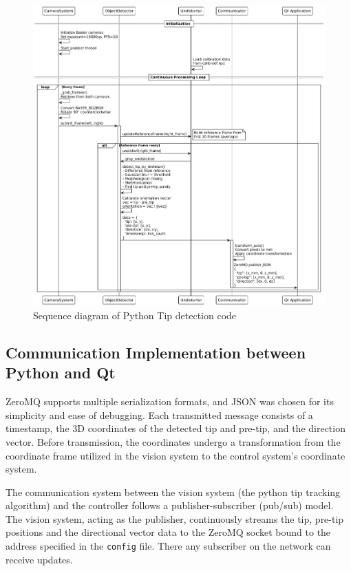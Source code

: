 \begin{figure}
    \centering
    \includegraphics[width=1.1\linewidth]{images/vision/pythonSequencediag.png}
    \caption{Sequence diagram of Python Tip detection code}
    \label{fig:seqpython}
\end{figure}


\subsection{Communication Implementation between Python and Qt}


ZeroMQ supports multiple serialization formats, and JSON was chosen for its simplicity and ease of debugging. Each transmitted message consists of a timestamp, the 3D coordinates of the detected tip and pre-tip, and the direction vector. Before transmission, the coordinates undergo a transformation from the coordinate frame utilized in the vision system to the control system's coordinate system. 

The communication system between the vision system (the python tip tracking algorithm) and the controller follows a publisher-subscriber (pub/sub) model. The vision system, acting as the publisher, continuously streams the tip, pre-tip positions and the directional vector data to the ZeroMQ socket bound to the address specified in the \texttt{config} file. There any subscriber on the network can receive updates. 

